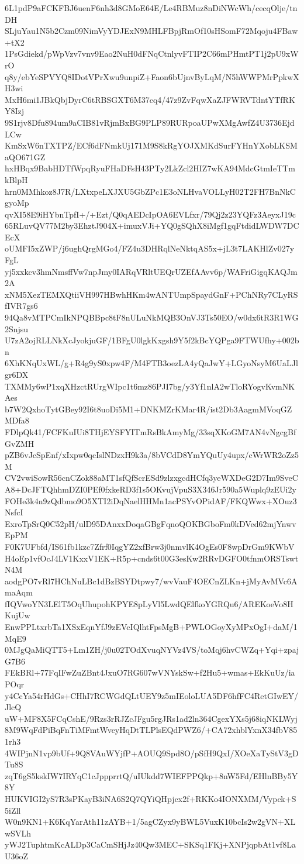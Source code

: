 6L1pdP9aFCKFBJ6uenF6nh3d8GMoE64E/Le4RBMuz8nDiNWcWh/cecqOlje/tnDH
SLjuYau1N5b2Czm09NimVyYDJExN9MHLFBpjRmOf10sHSomF72Mqoju4FBaw+tX2
1PsGdiekd/pWpVzv7vnv9Eao2NuH0dFNqCtnlyvFTIP2C66mPHmtPT1j2pU9xWrO
q8y/ebYeSPVYQ8IDotVPrXwu9unpiZ+Faon6bUjnvByLqM/N5hWWPMrPpkwXH3wi
MxH6mi1JBkQbjDyrC6tRBSGXT6M37cq4/47z9ZvFqwXaZJFWRVTdntYTfRKY8Izj
9S1rjv8Dfu894um9aCIB81vRjmBxBG9PLP89RURpoaUPwXMgAwfZ4U3736EjdLCw
KmSxW6nTXTPZ/ECf6dFNmkUj171M9S8kRgYOJXMKdSurFYHnYXobLKSMaQO671GZ
hxHBqx9BabHDTfWpqRyuFHaDFsH43PTy2LkZcl2HIZ7wKA94MdcGtmIeTTmkBlpH
hrn0MMhkoz8J7R/LXtxpeLXJXU5GbZPc1E3oNLHvaVOLLyH02T2FH7BnNkCgyoMp
qvXI58E9iHYbnTpfI+/+Ezt/Q0qAEDcIpOA6EVLfxr/79Qj2z23YQFz3AeyxJ19c
65RLuvQV77M2by3EhztJ904X+imuxVJi+YQ0gSQhX8iMgf1gqFtdidLWDW7DCEcX
oUMFI5xZWP/j6ughQrgMGo4/FZ4u3DHRqlNeNktqAS5x+jL3t7LAKHlZv027yFgL
yj5xxkcv3hmNmsffVw7npJmy0IARqVRltUEQrUZEfAAvv6p/WAFriGigqKAQJm2A
xNM5XezTEMXQtiiVH997HBwhHKm4wANTUmpSpaydGnF+PChNRy7CLyRSfIVR7gs6
94Qa8vMTPCmIkNPQBBpc8tF8nULuNkMQB3OnVJ3Ts50EO/w0dx6tR3R1WG2Snjsu
U7zA2ojRLLNkXcJyokjuGF/1BFgU0lgkKxgsh9Y5f2kBcYQPga9FTWUfhy+002bn
6XhKNqUxWL/g+R4g9yS0xpw4F/M4FTB3oezLA4yQaJwY+LGyoNsyM6UaLJlgr6DX
TXMMy6wP1xqXHzctRUrgWIpc1t6mz86PJI7bg/y3Yf1nlA2wTloRYogvKvmNKAes
b7W2QxhoTytGBey92I6t8uoDi5M1+DNKMZrKMar4R/ist2Db3AagmMVoqGZMDfa8
FDlpQk41/FCFKuIUi8THjEYSFYITmRsBkAmyMg/33sqXKoGM7AN4vNgcgBfGvZMH
pZB6vJcSpEnf/xIxpw0qcIslNDzxH9k3a/8bVCdD8YmYQuUy4upx/cWrWR2oZz5M
CV2vwiSowR56cnCZok88aMT1sfQfScrESd9zlzxgcdHCfq3yeWXDeG2D7Im9SveC
A8+DcJFTQhhmDZI0PEf0fxkeRD3f1s5OKvujVpuS3X346Jr590a5Wuplq9zEUi2y
FOHe3k4n9zQdbmo9O5XTI2iDqNaelHHMn1acPSYvOPidAF/FKQWwx+XOuz3NsfcI
ExroTpSrQ0C52pH/ulD95DAnxxDoqaGBgFqnoQOKBGboFm0kDVed62mjYnwvEpPM
F0K7UFbfd/IS61fb1kzc7Zfrf0IqgYZ2xfBrw3j0nmvlK4OgEs0F8wpDrGm9KWbV
H4oEp1vfOcJ4LV1KxxV1EK+R5p+cnds6t00G3esKw2RRvDGFO0tfnmORSTswtN4M
aodgPO7vRl7HChNuLBc1dBzBSYDtpwy7/wvVauF4OECnZLKn+jMyAvMVc6AmaAqm
fIQVwoYN3LElT5OqUhupohKPYE8pLyVl5LwdQElfkoYGRQu6/AREKoeVo8HKujUw
EnwPPLtxrbTa1XSxEqnYfJ9zEVcIQlhtFpsMgB+PWLOGoyXyMPxOgI+daM/1MqE9
0MJgQaMiQTT5+Lm1ZH/j0u02TOdXvuqNYVz4VS/toMqj6hvCWZq+Yqi+zpajG7B6
FEkBRl+77FqIFwZuZBnt4JxuO7RG607wVNYskSw+f2Hu5+wmas+EkKuUz/iaPOqr
y4CcYa54rHdGs+CHhI7RCWGdQLtUEY9z5mIEoloLUA5DF6hfFC4RetGIwEY/JlcQ
uW+MF8X5FCqCshE/9Rzs3rRJZcJFgu5rgJRs1ad2ln364CgexYXs5j68iqNKLWyj
8M9WqFdPiBqFnTiMFmtWveyHqDtTLPlsEQdPWZ6/+CA72xhblYxnX34fbV851rh3
4WIPjnN1vp9bUf+9Q8VAuWYjfP+AOUQ9Spd8O/pSfH9QxI/XOeXaTyStV3gDTu8S
zqT6gS5kskIW7IRYqC1cJppprrtQ/uIUkdd7WIEFPPQkp+8nW5Fd/EHlnBBy5Y8Y
HUKVIGI2yS7R3sPKayB3iNA6S2Q7QYiQHpjcx2f+RKKo4IONXMM/Vypck+S5iZll
W0n9KN1+K6KqYarAth11zAYB+1/5agCZyx9yBWL5VuxK10bcIs2w2gVN+XLwSVLh
yWJ2TuphtmKcALDp3CaCmSHjJz40Qw3MEC+SKSq1FKj+XNPjqpbAt1vf8LaU36oZ
